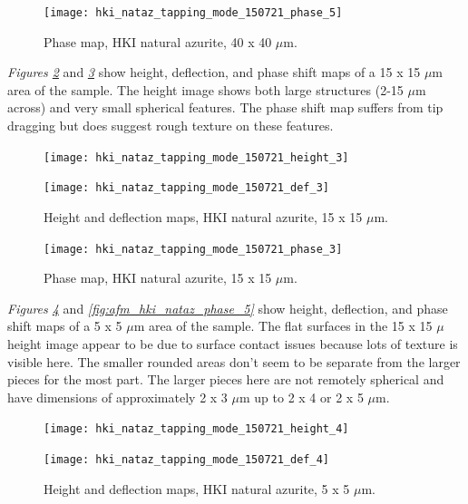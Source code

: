 \begin{figure}[H]
\centering
  \texttt{[image: hki\_nataz\_tapping\_mode\_150721\_phase\_5]}
\caption[Phase map, HKI natural azurite]{Phase map, HKI natural azurite, 40 x 40 $\mu$m.}
\label{fig:afm_hki_nataz_phase_3}
\end{figure}

\textit{Figures \ref{fig:afm_hki_nataz_height_def_4}} and \textit{\ref{fig:afm_hki_nataz_phase_4}} show height, deflection, and phase shift maps of a 15 x 15 $\mu$m area of the sample. The height image shows both large structures (2-15 $\mu$m across) and very small spherical features. The phase shift map suffers from tip dragging but does suggest rough texture on these features.

\begin{figure}[H]
\centering
\begin{minipage}{.45\textwidth}
  \centering
  \texttt{[image: hki\_nataz\_tapping\_mode\_150721\_height\_3]}
\end{minipage}
\begin{minipage}{.45\textwidth}
  \centering
  \texttt{[image: hki\_nataz\_tapping\_mode\_150721\_def\_3]}
\end{minipage}
\caption[Height and deflection maps, HKI natural azurite]{Height and deflection maps, HKI natural azurite, 15 x 15 $\mu$m.}
\label{fig:afm_hki_nataz_height_def_4}
\end{figure}

\begin{figure}[H]
\centering
  \texttt{[image: hki\_nataz\_tapping\_mode\_150721\_phase\_3]}
\caption[Phase map, HKI natural azurite]{Phase map, HKI natural azurite, 15 x 15 $\mu$m.}
\label{fig:afm_hki_nataz_phase_4}
\end{figure}

\textit{Figures \ref{fig:afm_hki_nataz_height_def_5}} and \textit{\ref{fig:afm_hki_nataz_phase_5}} show height, deflection, and phase shift maps of a 5 x 5 $\mu$m area of the sample. The flat surfaces in the 15 x 15 $\mu$ height image appear to be due to surface contact issues because lots of texture is visible here. The smaller rounded areas don’t seem to be separate from the larger pieces for the most part. The larger pieces here are not remotely spherical and have dimensions of approximately 2 x 3 $\mu$m up to 2 x 4 or 2 x 5 $\mu$m.

\begin{figure}[H]
\centering
\begin{minipage}{.45\textwidth}
  \centering
  \texttt{[image: hki\_nataz\_tapping\_mode\_150721\_height\_4]}
\end{minipage}
\begin{minipage}{.45\textwidth}
  \centering
  \texttt{[image: hki\_nataz\_tapping\_mode\_150721\_def\_4]}
\end{minipage}
\caption[Height and deflection maps, HKI natural azurite]{Height and deflection maps, HKI natural azurite, 5 x 5 $\mu$m.}
\label{fig:afm_hki_nataz_height_def_5}
\end{figure}

